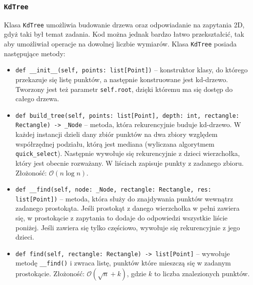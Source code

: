 \documentclass[11pt]{scrartcl}
\newcommand{\sO}{\mathcal O}
\begin{document}
\subsubsection{\texttt{KdTree}}
Klasa \texttt{KdTree} umożliwia budowanie drzewa oraz odpowiadanie na zapytania 2D, gdyż taki był temat zadania. Kod można jednak bardzo łatwo przekształcić, tak aby umożliwiał operacje na dowolnej liczbie wymiarów. Klasa \texttt{KdTree} posiada następujące metody:
\begin{itemize}
    \item \texttt{def \_\_init\_\_(self, points: list[Point])} -- konstruktor klasy, do którego przekazuje się listę punktów, a następnie konstruowane jest kd-drzewo. Tworzony jest też parametr \texttt{self.root}, dzięki któremu ma się dostęp do całego drzewa.
    \item \texttt{def build\_tree(self, points: list[Point], depth: int, rectangle: Rectangle) -> \_Node} -- metoda, która rekurencyjnie buduje kd-drzewo. W każdej instancji dzieli dany zbiór punktów na dwa zbiory względem współrzędnej podziału, którą jest mediana (wyliczana algorytmem \texttt{quick\_select}). Następnie wywołuje się rekurencyjnie z dzieci wierzchołka, który jest obecnie rozważany. W liściach zapisuje punkty z zadanego zbioru. 
    Złożoność: $\sO(n \log n)$.
    \item \texttt{def \_\_find(self, node: \_Node, rectangle: Rectangle, res: list[Point])} -- metoda, która służy do znajdywania punktów wewnątrz zadanego prostokąta. Jeśli prostokąt z danego wierzchołka w pełni zawiera się, w prostokącie z zapytania to dodaje do odpowiedzi wszystkie liście poniżej. Jeśli zawiera się tylko częściowo, wywołuje się rekurencyjnie z jego dzieci.
    \item \texttt{def find(self, rectangle: Rectangle) -> list[Point]} -- wywołuje metodę \texttt{\_\_find()} i zwraca listę, punktów które mieszczą się w zadanym prostokącie.
    Złożoność: $\sO(\sqrt n + k)$, gdzie $k$ to liczba znalezionych punktów.
\end{itemize}

\newpage
\end{document}
